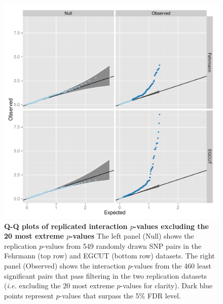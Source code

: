 \documentclass{article}
\begin{document}
\begin{figure}
	\includegraphics[width=5in]{qqfdr}
	\caption{\textbf{Q-Q plots of replicated interaction $p$-values excluding the 20 most extreme $p$-values} The left panel (Null) shows the replication $p$-values from 549 randomly drawn SNP pairs in the Fehrmann (top row) and EGCUT (bottom row) datasets. The right panel (Observed) shows the interaction $p$-values from the 460 least significant pairs that pass filtering in the two replication datasets (\emph{i.e.} excluding the 20 most extreme $p$-values for clarity). Dark blue points represent $p$-values that surpass the 5\% FDR level.}
\label{fig:qqplotfdr}
\end{figure}
\clearpage
\end{document}
